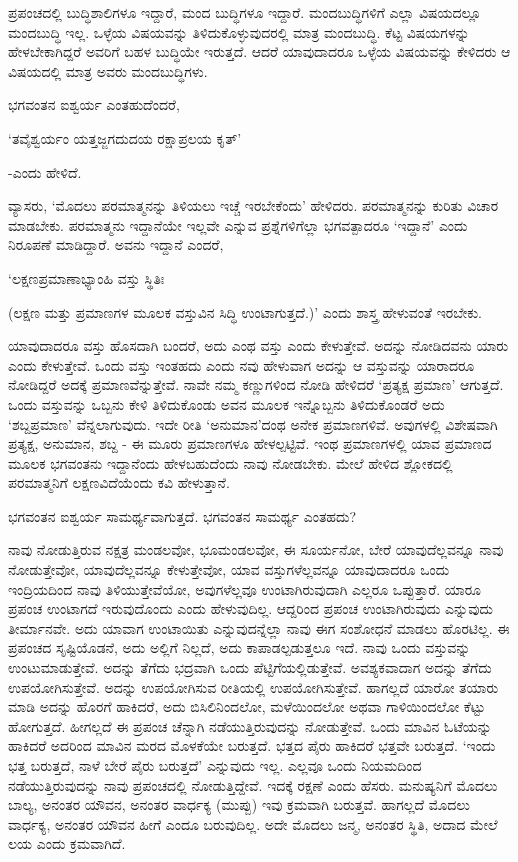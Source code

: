 ಪ್ರಪಂಚದಲ್ಲಿ ಬುದ್ಧಿಶಾಲಿಗಳೂ ಇದ್ದಾರೆ, ಮಂದ ಬುದ್ಧಿಗಳೂ ಇದ್ದಾರೆ. ಮಂದಬುದ್ಧಿಗಳಿಗೆ ಎಲ್ಲಾ ವಿಷಯದಲ್ಲೂ ಮಂದಬುದ್ಧಿ ಇಲ್ಲ. ಒಳ್ಳೆಯ ವಿಷಯವನ್ನು ತಿಳಿದುಕೊಳ್ಳುವುದರಲ್ಲಿ ಮಾತ್ರ ಮಂದಬುದ್ಧಿ. ಕೆಟ್ಟ ವಿಷಯಗಳನ್ನು ಹೇಳಬೇಕಾಗಿದ್ದರೆ ಅವರಿಗೆ ಬಹಳ ಬುದ್ಧಿಯೇ ಇರುತ್ತದೆ. ಆದರೆ ಯಾವುದಾದರೂ ಒಳ್ಳೆಯ ವಿಷಯವನ್ನು ಕೇಳಿದರು ಆ ವಿಷಯದಲ್ಲಿ ಮಾತ್ರ ಅವರು ಮಂದಬುದ್ಧಿಗಳು.

ಭಗವಂತನ ಐಶ್ವರ್ಯ ಎಂತಹುದೆಂದರೆ,

\begin{shloka}
`ತವೈಶ್ವರ್ಯಂ ಯತ್ತಜ್ಜಗದುದಯ ರಕ್ಷಾಪ್ರಲಯ ಕೃತ್'
\end{shloka}

-ಎಂದು ಹೇಳಿದೆ.

ವ್ಯಾಸರು, `ಮೊದಲು ಪರಮಾತ್ಮನನ್ನು ತಿಳಿಯಲು ಇಚ್ಚೆ ಇರಬೇಕೆಂದು' ಹೇಳಿದರು. ಪರಮಾತ್ಮನನ್ನು ಕುರಿತು ವಿಚಾರ ಮಾಡಬೇಕು. ಪರಮಾತ್ಮನು ಇದ್ದಾನೆಯೇ ಇಲ್ಲವೇ ಎನ್ನುವ ಪ್ರಶ್ನೆಗಳಿಗೆಲ್ಲಾ ಭಗವತ್ಪಾದರೂ `ಇದ್ದಾನೆ' ಎಂದು ನಿರೂಪಣೆ ಮಾಡಿದ್ದಾರೆ. ಅವನು ಇದ್ದಾನೆ ಎಂದರೆ,

\begin{shloka}
`ಲಕ್ಷಣಪ್ರಮಾಣಾಭ್ಯಾಂಹಿ ವಸ್ತು ಸ್ಥಿತಿಃ
\end{shloka}

(ಲಕ್ಷಣ ಮತ್ತು ಪ್ರಮಾಣಗಳ ಮೂಲಕ ವಸ್ತುವಿನ ಸಿದ್ಧಿ ಉಂಟಾಗುತ್ತದೆ.)' ಎಂದು ಶಾಸ್ತ್ರ ಹೇಳುವಂತೆ ಇರಬೇಕು.

ಯಾವುದಾದರೂ ವಸ್ತು ಹೊಸದಾಗಿ ಬಂದರೆ, ಅದು ಎಂಥ ವಸ್ತು ಎಂದು ಕೇಳುತ್ತೇವೆ. ಅದನ್ನು ನೋಡಿದವನು ಯಾರು ಎಂದು ಕೇಳುತ್ತೇವೆ. ಒಂದು ವಸ್ತು ಇಂತಹದು ಎಂದು ನವು ಹೇಳುವಾಗ ಅದನ್ನು ಆ ವಸ್ತುವನ್ನು ಯಾರಾದರೂ ನೋಡಿದ್ದರೆ ಅದಕ್ಕೆ ಪ್ರಮಾಣವೆನ್ನುತ್ತೇವೆ. ನಾವೇ ನಮ್ಮ ಕಣ್ಣುಗಳಿಂದ ನೋಡಿ ಹೇಳಿದರೆ `ಪ್ರತ್ಯಕ್ಷ ಪ್ರಮಾಣ' ಆಗುತ್ತದೆ. ಒಂದು ವಸ್ತುವನ್ನು ಒಬ್ಬನು ಕೇಳಿ ತಿಳಿದುಕೊಂಡು ಅವನ ಮೂಲಕ ಇನ್ನೊಬ್ಬನು ತಿಳಿದುಕೊಂಡರೆ ಅದು `ಶಬ್ದಪ್ರಮಾಣ' ವೆನ್ನಲಾಗುವುದು. ಇದೇ ರೀತಿ `ಅನುಮಾನ'ದಂಥ ಅನೇಕ ಪ್ರಮಾಣಗಳಿವೆ. ಅವುಗಳಲ್ಲಿ ವಿಶೇಷವಾಗಿ ಪ್ರತ್ಯಕ್ಷ, ಅನುಮಾನ, ಶಬ್ದ - ಈ ಮೂರು ಪ್ರಮಾಣಗಳೂ ಹೇಳಲ್ಪಟ್ಟಿವೆ. ಇಂಥ ಪ್ರಮಾಣಗಳಲ್ಲಿ ಯಾವ ಪ್ರಮಾಣದ ಮೂಲಕ ಭಗವಂತನು ಇದ್ದಾನೆಂದು ಹೇಳಬಹುದೆಂದು ನಾವು ನೋಡಬೇಕು. ಮೇಲೆ ಹೇಳಿದ ಶ್ಲೋಕದಲ್ಲಿ ಪರಮಾತ್ಮನಿಗೆ ಲಕ್ಷಣವಿದೆಯೆಂದು ಕವಿ ಹೇಳುತ್ತಾನೆ.

ಭಗವಂತನ ಐಶ್ವರ್ಯ ಸಾಮರ್ಥ್ಯವಾಗುತ್ತದೆ. ಭಗವಂತನ ಸಾಮರ್ಥ್ಯ ಎಂತಹದು?

ನಾವು ನೋಡುತ್ತಿರುವ ನಕ್ಷತ್ರ ಮಂಡಲವೋ, ಭೂಮಂಡಲವೋ, ಈ ಸೂರ್ಯನೋ, ಬೇರೆ ಯಾವುದೆಲ್ಲವನ್ನೂ ನಾವು ನೋಡುತ್ತೇವೋ, ಯಾವುದೆಲ್ಲವನ್ನೂ ಕೇಳುತ್ತೇವೋ, ಯಾವ ವಸ್ತುಗಳೆಲ್ಲವನ್ನೂ ಯಾವುದಾದರೂ ಒಂದು ಇಂದ್ರಿಯದಿಂದ ನಾವು ತಿಳಿಯುತ್ತೇವೆಯೋ, ಅವುಗಳೆಲ್ಲವೂ ಉಂಟಾಗಿರುವುದಾಗಿ ಎಲ್ಲರೂ ಒಪ್ಪುತ್ತಾರೆ. ಯಾರೂ ಪ್ರಪಂಚ ಉಂಟಾಗದೆ ಇರುವುದೊಂದು ಎಂದು ಹೇಳುವುದಿಲ್ಲ. ಆದ್ದರಿಂದ ಪ್ರಪಂಚ ಉಂಟಾಗಿರುವುದು ಎನ್ನುವುದು ತೀರ್ಮಾನವೇ. ಅದು ಯಾವಾಗ ಉಂಟಾಯಿತು ಎನ್ನುವುದನ್ನೆಲ್ಲಾ ನಾವು ಈಗ ಸಂಶೋಧನೆ ಮಾಡಲು ಹೊರಟಿಲ್ಲ. ಈ ಪ್ರಪಂಚದ ಸೃಷ್ಟಿಯೊಡನೆ, ಅದು ಅಲ್ಲಿಗೆ ನಿಲ್ಲದೆ, ಅದು ಕಾಪಾಡಲ್ಪಡುತ್ತಲೂ ಇದೆ. ನಾವು ಒಂದು ವಸ್ತುವನ್ನು ಉಂಟುಮಾಡುತ್ತೇವೆ. ಅದನ್ನು ತೆಗೆದು ಭದ್ರವಾಗಿ ಒಂದು ಪೆಟ್ಟಿಗೆಯಲ್ಲಿಡುತ್ತೇವೆ. ಅವಶ್ಯಕವಾದಾಗ ಅದನ್ನು ತೆಗೆದು ಉಪಯೋಗಿಸುತ್ತೇವೆ. ಅದನ್ನು ಉಪಯೋಗಿಸುವ ರೀತಿಯಲ್ಲಿ ಉಪಯೋಗಿಸುತ್ತೇವೆ. ಹಾಗಲ್ಲದೆ ಯಾರೋ ತಯಾರು ಮಾಡಿ ಅದನ್ನು ಹೊರಗೆ ಹಾಕಿದರೆ, ಅದು ಬಿಸಿಲಿನಿಂದಲೋ, ಮಳೆಯಿಂದಲೋ ಅಥವಾ ಗಾಳಿಯಿಂದಲೋ ಕೆಟ್ಟು ಹೋಗುತ್ತದೆ. ಹೀಗಲ್ಲದೆ ಈ ಪ್ರಪಂಚ ಚೆನ್ನಾಗಿ ನಡೆಯುತ್ತಿರುವುದನ್ನು ನೋಡುತ್ತೇವೆ. ಒಂದು ಮಾವಿನ ಓಟೆಯನ್ನು ಹಾಕಿದರೆ ಅದರಿಂದ ಮಾವಿನ ಮರದ ಮೊಳಕೆಯೇ ಬರುತ್ತದೆ. ಭತ್ತದ ಪೈರು ಹಾಕಿದರೆ ಭತ್ತವೇ ಬರುತ್ತದೆ. `ಇಂದು ಭತ್ತ ಬರುತ್ತದೆ, ನಾಳೆ ಬೇರೆ ಪೈರು ಬರುತ್ತದೆ' ಎನ್ನುವುದು ಇಲ್ಲ. ಎಲ್ಲವೂ ಒಂದು ನಿಯಮದಿಂದ ನಡೆಯುತ್ತಿರುವುದನ್ನು ನಾವು ಪ್ರಪಂಚದಲ್ಲಿ ನೋಡುತ್ತಿದ್ದೇವೆ. ಇದಕ್ಕೆ ರಕ್ಷಣೆ ಎಂದು ಹೆಸರು. ಮನುಷ್ಯನಿಗೆ ಮೊದಲು ಬಾಲ್ಯ, ಅನಂತರ ಯೌವನ, ಅನಂತರ ವಾರ್ಧಕ್ಯ (ಮುಪ್ಪು) ಇವು ಕ್ರಮವಾಗಿ ಬರುತ್ತವೆ. ಹಾಗಲ್ಲದೆ ಮೊದಲು ವಾರ್ಧಕ್ಯ, ಅನಂತರ ಯೌವನ ಹೀಗೆ ಎಂದೂ ಬರುವುದಿಲ್ಲ. ಅದೇ ಮೊದಲು ಜನ್ಮ, ಅನಂತರ ಸ್ಥಿತಿ, ಅದಾದ ಮೇಲೆ ಲಯ ಎಂದು ಕ್ರಮವಾಗಿದೆ.

